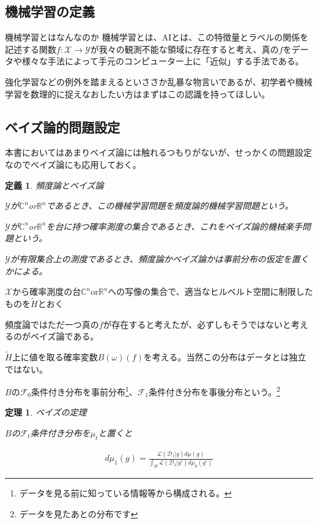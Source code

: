 \documentclass{jsarticle}
\newtheorem{theo}{定理}[section]
\newtheorem{defi}{定義}[section]
\begin{document}
\subsection{機械学習の定義}

\begin{itembox}[l]{機械学習とはなんなのか}
機械学習とは、AIとは、この特徴量とラベルの関係を記述する関数$f:\mathcal{X}\to \mathcal{Y}$が我々の観測不能な領域に存在すると考え、真の$f$をデータや様々な手法によって手元のコンピューター上に「近似」する手法である。
\end{itembox}

強化学習などの例外を踏まえるといささか乱暴な物言いであるが、初学者や機械学習を数理的に捉えなおしたい方はまずはこの認識を持ってほしい。


\subsection{ベイズ論的問題設定}

本書においてはあまりベイズ論には触れるつもりがないが、せっかくの問題設定なのでベイズ論にも応用しておく。

\begin{defi} 頻度論とベイズ論

$\mathcal{Y}$が$\mathbb{C}^n$or$\mathbb{R}^n$であるとき、この機械学習問題を頻度論的機械学習問題という。

$\mathcal{Y}$が$\mathbb{C}^n$or$\mathbb{R}^n$を台に持つ確率測度の集合であるとき、これをベイズ論的機械楽手問題という。

$\mathcal{Y}$が有限集合上の測度であるとき、頻度論かベイズ論かは事前分布の仮定を置くかによる。

\end{defi}

$\mathcal{X}$から確率測度の台$\mathbb{C}^n$or$\mathbb{R}^n$への写像の集合で、適当なヒルベルト空間に制限したものを$\tilde{H}$とおく

頻度論ではただ一つ真の$f$が存在すると考えたが、必ずしもそうではないと考えるのがベイズ論である。

$\tilde{H}$上に値を取る確率変数$B(\omega)(f)$を考える。当然この分布はデータとは独立ではない。

$B$の$\mathcal{F}_0$条件付き分布を事前分布\footnote{データを見る前に知っている情報等から構成される。}、$\mathcal{F}_1$条件付き分布を事後分布という。\footnote{データを見たあとの分布です}

\begin{theo} ベイズの定理

$B$の$\mathcal{F}_t$条件付き分布を$\mu_t$と置くと

\begin{align}
d\mu_1(g) =\frac{\mathcal{L}(\mathcal{D}_1|g)d\mu(g)}{\int_H \mathcal{L}(\mathcal{D}_1|g')d\mu_0(g')}
\end{align}

\end{theo}
\end{document}
